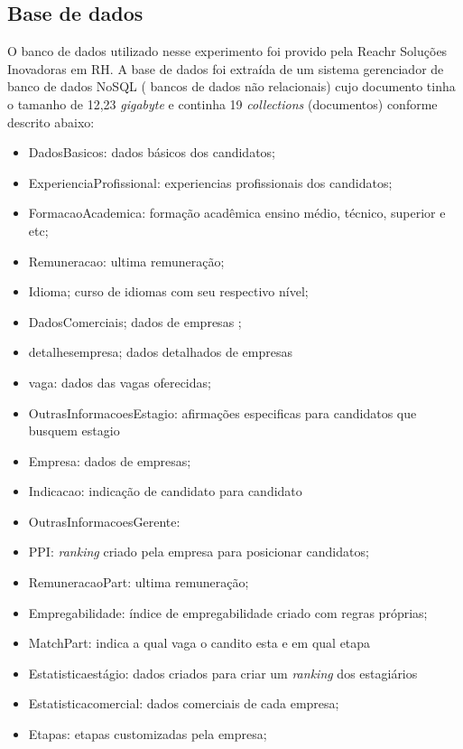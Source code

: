 \documentclass[conference]{IEEEtran}
\begin{document}
    \subsection{Base de dados}

 O banco de dados utilizado nesse experimento foi provido pela Reachr Soluções Inovadoras em RH.
A base de dados foi extraída de um sistema gerenciador de banco de dados NoSQL ( bancos de dados não relacionais) cujo documento tinha o tamanho de 12,23 \textit{gigabyte} e continha 19 \textit{collections} (documentos) conforme descrito abaixo:

\begin{itemize}
\item DadosBasicos: dados básicos dos candidatos;
\item ExperienciaProfissional: experiencias profissionais dos candidatos;
\item FormacaoAcademica: formação acadêmica ensino médio, técnico, superior e etc;
\item Remuneracao: ultima remuneração;
\item Idioma; curso de idiomas com seu respectivo nível;
\item DadosComerciais; dados de empresas ;
\item detalhesempresa; dados detalhados de empresas
\item vaga: dados das vagas oferecidas;
\item OutrasInformacoesEstagio: afirmações especificas para candidatos que busquem estagio
\item Empresa: dados de empresas;
\item Indicacao: indicação de candidato para candidato
\item OutrasInformacoesGerente: 
\item PPI: \textit{ranking} criado pela empresa para posicionar candidatos;
\item RemuneracaoPart: ultima remuneração;
\item Empregabilidade: índice de empregabilidade criado com regras próprias;
\item MatchPart: indica a qual vaga o candito esta e em qual etapa
\item Estatisticaestágio: dados criados para criar um \textit{ranking} dos estagiários
\item Estatisticacomercial: dados comerciais de cada empresa;
\item Etapas: etapas customizadas pela empresa;
\end{itemize}
\end{document}
